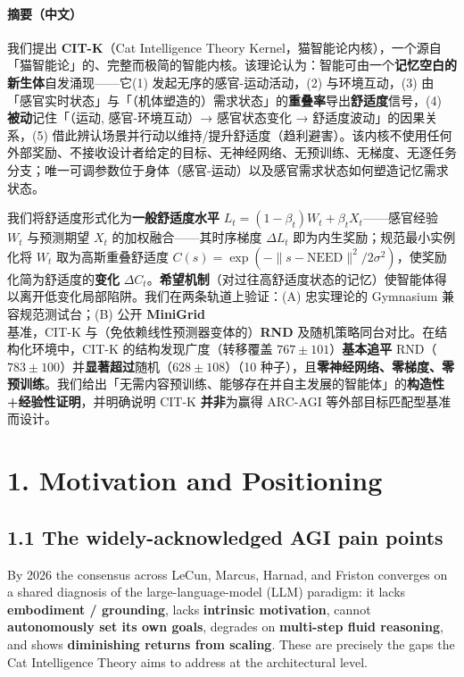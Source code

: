 \documentclass[11pt]{article}
\begin{document}
\paragraph{摘要（中文）}

我们提出 \textbf{CIT-K}（Cat Intelligence Theory Kernel，猫智能论内核），一个源自「猫智能论」的、完整而极简的智能内核。该理论认为：智能可由一个\textbf{记忆空白的新生体}自发涌现——它(1) 发起无序的感官-运动活动，(2) 与环境互动，(3) 由「感官实时状态」与「（机体塑造的）需求状态」的\textbf{重叠率}导出\textbf{舒适度}信号，(4) \textbf{被动}记住「（运动, 感官-环境互动）→ 感官状态变化 → 舒适度波动」的因果关系，(5) 借此辨认场景并行动以维持/提升舒适度（趋利避害）。该内核不使用任何外部奖励、不接收设计者给定的目标、无神经网络、无预训练、无梯度、无逐任务分支；唯一可调参数位于身体（感官-运动）以及感官需求状态如何塑造记忆需求状态。

我们将舒适度形式化为\textbf{一般舒适度水平} $L_t=(1-\beta_t)W_t+\beta_t X_t$——感官经验 $W_t$ 与预测期望 $X_t$ 的加权融合——其时序梯度 $\Delta L_t$ 即为内生奖励；规范最小实例化将 $W_t$ 取为高斯重叠舒适度 $C(s)=\exp(-\|s-\text{NEED}\|^2/2\sigma^2)$，使奖励化简为舒适度的\textbf{变化} $\Delta C_t$。\textbf{希望机制}（对过往高舒适度状态的记忆）使智能体得以离开低变化局部陷阱。我们在两条轨道上验证：(A) 忠实理论的 Gymnasium 兼容规范测试台；(B) 公开 \textbf{MiniGrid} 基准，CIT-K 与（免依赖线性预测器变体的）\textbf{RND} 及随机策略同台对比。在结构化环境中，CIT-K 的结构发现广度（转移覆盖 $767\pm101$）\textbf{基本追平} RND（$783\pm100$）并\textbf{显著超过}随机（$628\pm108$）（10 种子），且\textbf{零神经网络、零梯度、零预训练}。我们给出「无需内容预训练、能够存在并自主发展的智能体」的\textbf{构造性+经验性证明}，并明确说明 CIT-K \textbf{并非}为赢得 ARC-AGI 等外部目标匹配型基准而设计。

\section{1. Motivation and Positioning}

\subsection{1.1 The widely-acknowledged AGI pain points}
By 2026 the consensus across LeCun, Marcus, Harnad, and Friston converges on a shared diagnosis of the large-language-model (LLM) paradigm: it lacks \textbf{embodiment / grounding}, lacks \textbf{intrinsic motivation}, cannot \textbf{autonomously set its own goals}, degrades on \textbf{multi-step fluid reasoning}, and shows \textbf{diminishing returns from scaling}. These are precisely the gaps the Cat Intelligence Theory aims to address at the architectural level.
\end{document}
